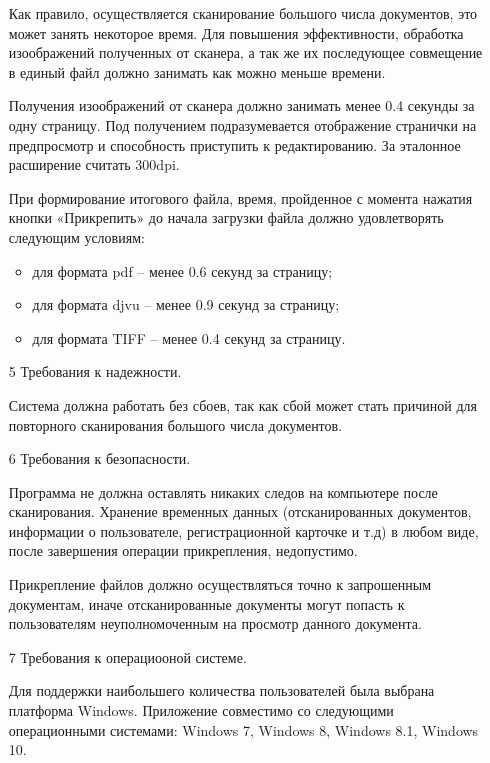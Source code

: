 \begin{itemize}
  \hspace*{2.5em}Как правило, осуществляется сканирование большого числа документов, это может занять некоторое время. Для повышения эффективности, обработка изоображений полученных от сканера, а так же их последующее совмещение в единый файл должно занимать как можно меньше времени. 

  \hspace*{2.5em}Получения изоображений от сканера должно занимать менее 0.4 секунды за одну страницу. Под получением подразумевается отображение странички на предпросмотр и способность приступить к редактированию. За эталонное расширение считать 300dpi.

  \hspace*{2.5em}При формирование итогового файла, время, пройденное с момента нажатия кнопки «Прикрепить» до начала загрузки файла должно удовлетворять следующим условиям:
	\begin{itemize}
		\item для формата pdf – менее 0.6 секунд за страницу;
		\item для формата djvu – менее 0.9 секунд за страницу;
		\item для формата TIFF – менее 0.4 секунд за страницу.
	\end{itemize}
  \item[5] Требования к надежности.

  \hspace*{2.5em}Система должна работать без сбоев, так как сбой может стать причиной для повторного сканирования большого числа документов.

  \item[6] Требования к безопасности.

  \hspace*{2.5em}Программа не должна оставлять никаких следов на компьютере после сканирования. Хранение временных данных (отсканированных документов, информации о пользователе, регистрационной карточке и т.д) в любом виде, после завершения операции прикрепления, недопустимо.

  \hspace*{2.5em}Прикрепление файлов должно осуществляться точно к запрошенным документам, иначе отсканированные документы  могут попасть к пользователям неуполномоченным на просмотр данного документа.
  
  \item[7] Требования к операциооной системе.

  \hspace*{2.5em}Для поддержки наибольшего количества пользователей была выбрана платформа Windows. Приложение совместимо со следующими операционными системами: Windows 7, Windows 8, Windows 8.1, Windows 10.

\end{itemize}